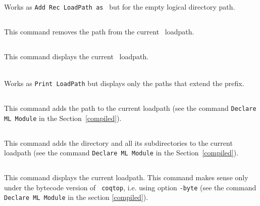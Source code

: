 \begin{Variants}
\item {}\\
Works as {\tt Add Rec LoadPath {\str} as {\dirpath}} but for the empty logical directory path.
\end{Variants}

\subsection[\tt Remove LoadPath {\str}.]{}
This command removes the path {\str} from the current \Coq\ loadpath.

\subsection[\tt Print LoadPath.]{}
This command displays the current \Coq\ loadpath.

\begin{Variants}
\item {}\\
Works as {\tt Print LoadPath} but displays only the paths that extend the {\dirpath} prefix.
\end{Variants}

\subsection[\tt Add ML Path {\str}.]{}
This command adds the path {\str} to the current {\ocaml} loadpath (see
the command {\tt Declare ML Module} in the Section~\ref{compiled}).

\subsection[\tt Add Rec ML Path {\str}.]{}
This command adds the directory {\str} and all its subdirectories 
to the current {\ocaml} loadpath (see
the command {\tt Declare ML Module} in the Section~\ref{compiled}).

\subsection[\tt Print ML Path {\str}.]{}
This command displays the current {\ocaml} loadpath.
This command makes sense only under the bytecode version of {\tt
coqtop}, i.e. using option {\tt -byte} (see the
command {\tt Declare ML Module} in the section
\ref{compiled}).

